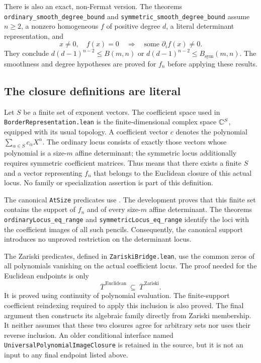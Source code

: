 There is also an exact, non-Fermat version.  The theorems
\nolinkurl{ordinary_smooth_degree_bound} and
\nolinkurl{symmetric_smooth_degree_bound} assume $n\geq2$, a nonzero
homogeneous $f$ of positive degree $d$, a literal determinant representation,
and
\[
 x\ne0,\quad f(x)=0\quad\Longrightarrow\quad
 \text{some }\partial_i f(x)\ne0.
\]
They conclude $d(d-1)^{n-2}\leq B(m,n)$ or
$d(d-1)^{n-2}\leq B_{\mathrm{sym}}(m,n)$.  The smoothness and degree
hypotheses are proved for $f_n$ before applying these results.

\subsection{The closure definitions are literal}
\label{app:lean-closure}

Let $S$ be a finite set of exponent vectors.  The coefficient space used in
\nolinkurl{BorderRepresentation.lean} is the finite-dimensional complex
space $\mathbb{C}^S$, equipped with its usual topology.  A coefficient vector $c$
denotes the polynomial $\sum_{\alpha\in S}c_\alpha X^\alpha$.  The ordinary
locus consists of exactly those vectors whose polynomial is a size-$m$
affine determinant; the symmetric locus additionally requires symmetric
coefficient matrices.  Thus
\texttt{} means that there exists a finite
$S$ and a vector representing $f_n$ that belongs to the Euclidean closure
of this actual locus.  No family or specialization assertion is part of
this definition.

The canonical \nolinkurl{AtSize} predicates use
\texttt{}.  The development proves that this
finite set contains the support of $f_n$ and of every size-$m$ affine
determinant.  The theorems \nolinkurl{ordinaryLocus_eq_range} and
\nolinkurl{symmetricLocus_eq_range} identify the loci with the coefficient
images of all such pencils.  Consequently, the canonical support introduces
no unproved restriction on the determinant locus.

The Zariski predicates, defined in \nolinkurl{ZariskiBridge.lean}, use the
common zeros of all polynomials vanishing on the actual coefficient locus.
The proof needed for the Euclidean endpoints is only
\[
 \overline{T}^{\,\mathrm{Euclidean}}
 \ \subseteq\ \overline{T}^{\,\mathrm{Zariski}}.
\]
It is proved using continuity of polynomial evaluation.  The finite-support
coefficient reindexing required to apply this inclusion is also proved.
The final argument then constructs its algebraic family directly from
Zariski membership.  It neither assumes that these two closures agree for
arbitrary sets nor uses their reverse inclusion.  An older conditional
interface named \nolinkurl{UniversalPolynomialImageClosure} is retained in
the source, but it is not an input to any final endpoint listed above.

